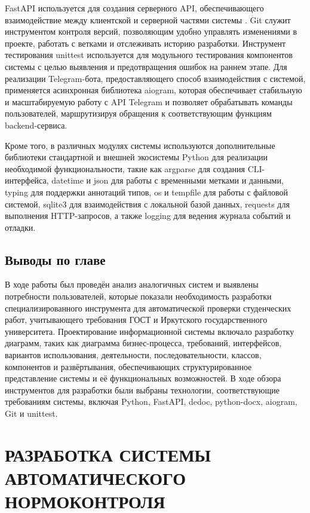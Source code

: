 \documentclass{report}
\begin{document}
FastAPI используется для создания серверного API, обеспечивающего взаимодействие между клиентской и серверной частями системы \cite{fastapi}. Git служит инструментом контроля версий, позволяющим удобно управлять изменениями в проекте, работать с ветками и отслеживать историю разработки. Инструмент тестирования unittest используется для модульного тестирования компонентов системы с целью выявления и предотвращения ошибок на раннем этапе. Для реализации Telegram-бота, предоставляющего способ взаимодействия с системой, применяется асинхронная библиотека aiogram, которая обеспечивает стабильную и масштабируемую работу с API Telegram и позволяет обрабатывать команды пользователей, маршрутизируя обращения к соответствующим функциям backend-сервиса.

Кроме того, в различных модулях системы используются дополнительные библиотеки стандартной и внешней экосистемы Python для реализации необходимой функциональности, такие как argparse для создания CLI-интерфейса, datetime и json для работы с временными метками и данными, typing для поддержки аннотаций типов, os и tempfile для работы с файловой системой, sqlite3 для взаимодействия с локальной базой данных, requests для выполнения HTTP-запросов, а также logging для ведения журнала событий и отладки.

\section*{Выводы по главе}

В ходе работы был проведён анализ аналогичных систем и выявлены потребности пользователей, которые показали необходимость разработки специализированного инструмента для автоматической проверки студенческих работ, учитывающего требования ГОСТ и Иркутского государственного университета. Проектирование информационной системы включало разработку диаграмм, таких как диаграмма бизнес-процесса, требований, интерфейсов, вариантов использования, деятельности, последовательности, классов, компонентов и развёртывания, обеспечивающих структурированное представление системы и её функциональных возможностей. В ходе обзора инструментов для разработки были выбраны технологии, соответствующие требованиям системы, включая Python, FastAPI, dedoc, python-docx, aiogram, Git и unittest.


\chapter{РАЗРАБОТКА СИСТЕМЫ АВТОМАТИЧЕСКОГО НОРМОКОНТРОЛЯ}
\setcounter{section}{0}
\setcounter{subsection}{0}
\setcounter{equation}{0}
\end{document}
